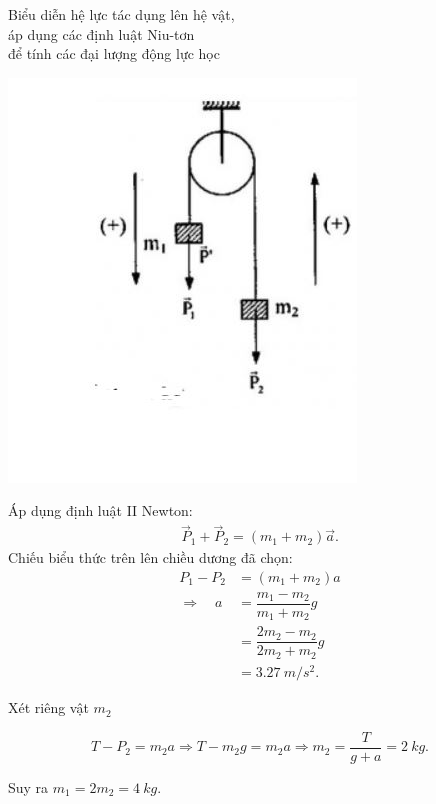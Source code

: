 \begin{dang}{Biểu diễn hệ lực tác dụng lên hệ vật, \\áp dụng các định luật Niu-tơn \\để tính các đại lượng động lực học}
{		\begin{center}
			\includegraphics[scale=0.6]{../figs/VN10-PH-12-A-003-1-V2-05.jpg}
		\end{center}	
		Áp dụng định luật II Newton:
			\begin{align*}
				\vec P_1 + \vec P_2 =(m_1 + m_2) \vec a.
			\end{align*}
		Chiếu biểu thức trên lên chiều dương đã chọn:
			\begin{align*}
				P_1 - P_2 &=(m_1+m_2)a \\
				\Rightarrow\quad a &= \dfrac{m_1 - m_2}{m_1 +m_2} g\\
				&= \dfrac{2m_2 -m_2}{2m_2 + m_2}g	\\
				&= \SI{3,27}{m/s^2}.
			\end{align*}
	
		Xét riêng vật $m_2$ 
		
		$$T - P_2 =m_2a \Rightarrow T -m_2g = m_2a \Rightarrow m_2 = \dfrac{T}{g+a} = \SI{2}{kg}.$$
		
		Suy ra $m_1 =2m_2 = \SI{4}{kg}.$
	}
	
\end{dang}